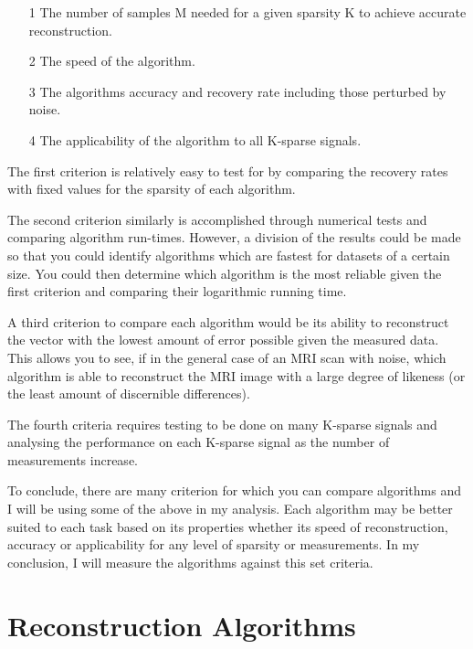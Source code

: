 \documentclass[titlepage,oneside, 12pt]{book}
\theoremstyle{break}
\begin{document}
\begin{itemize}
\item[1] The number of samples M needed for a given sparsity K to achieve accurate reconstruction. 

\item[2] The speed of the algorithm. 

\item[3] The algorithms accuracy and recovery rate including those perturbed by noise. 

\item[4] The applicability of the algorithm to all K-sparse signals. 

\end{itemize}

The first criterion is relatively easy to test for by comparing the recovery rates with fixed values for the sparsity of each algorithm. 

The second criterion similarly is accomplished through numerical tests and comparing algorithm run-times. However, a division of the results could be made so that you could identify algorithms which are fastest for datasets of a certain size. You could then determine which algorithm is the most reliable given the first criterion and comparing their logarithmic running time. 

A third criterion to compare each algorithm would be its ability to reconstruct the vector with the lowest amount of error possible given the measured data. This allows you to see, if in the general case of an MRI scan with noise, which algorithm is able to reconstruct the MRI image with a large degree of likeness (or the least amount of discernible differences).

The fourth criteria requires testing to be done on many K-sparse signals and analysing the performance on each K-sparse signal as the number of measurements increase. 

To conclude, there are many criterion for which you can compare algorithms and I will be using some of the above in my analysis. Each algorithm may be better suited to each task based on its properties whether its speed of reconstruction, accuracy or applicability for any level of sparsity or measurements. In my conclusion, I will measure the algorithms against this set criteria. 

\newpage




\newpage


\chapter{Reconstruction Algorithms}
\end{document}
